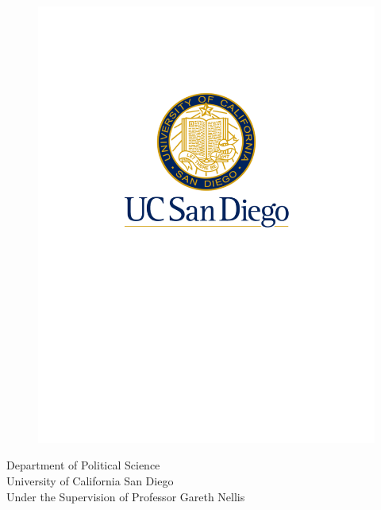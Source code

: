\documentclass[letterpaper, 12pt]{article}
\begin{document}
\begin{titlepage}
\begingroup
\begin{figure}[!h]
    \centering
    \includegraphics[scale=0.35]{Visuals/UCSD_logo.pdf}
\end{figure}
\begin{center}
\fontsize{12}{14} \selectfont
    Department of Political Science \\
    University of California San Diego\\
    Under the Supervision of Professor Gareth Nellis \\
\end{center}

\endgroup


\end{titlepage}
\end{document}
